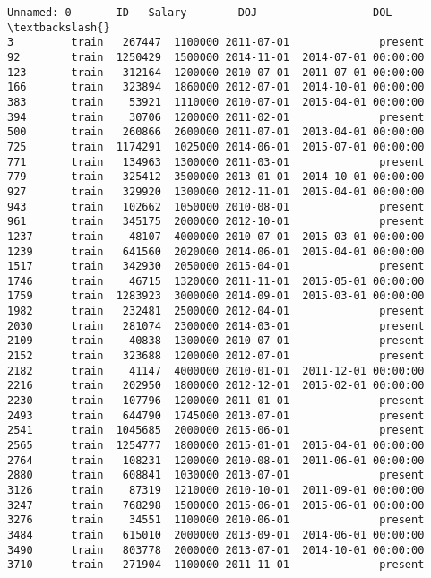 \documentclass[11pt]{article}
\makeatletter
\newcommand{\boxspacing}{\kern\kvtcb@left@rule\kern\kvtcb@boxsep}
\newcommand{\prompt}[4]{
        \ttfamily\llap{{\color{#2}[#3]:\hspace{3pt}#4}}\vspace{-\baselineskip}
    }
\makeatother
\begin{document}
            \begin{tcolorbox}[breakable, size=fbox, boxrule=.5pt, pad at break*=1mm, opacityfill=0]
\prompt{Out}{outcolor}{16}{\boxspacing}
\begin{Verbatim}[commandchars=\\\{\}]
     Unnamed: 0       ID   Salary        DOJ                  DOL  \textbackslash{}
3         train   267447  1100000 2011-07-01              present
92        train  1250429  1500000 2014-11-01  2014-07-01 00:00:00
123       train   312164  1200000 2010-07-01  2011-07-01 00:00:00
166       train   323894  1860000 2012-07-01  2014-10-01 00:00:00
383       train    53921  1110000 2010-07-01  2015-04-01 00:00:00
394       train    30706  1200000 2011-02-01              present
500       train   260866  2600000 2011-07-01  2013-04-01 00:00:00
725       train  1174291  1025000 2014-06-01  2015-07-01 00:00:00
771       train   134963  1300000 2011-03-01              present
779       train   325412  3500000 2013-01-01  2014-10-01 00:00:00
927       train   329920  1300000 2012-11-01  2015-04-01 00:00:00
943       train   102662  1050000 2010-08-01              present
961       train   345175  2000000 2012-10-01              present
1237      train    48107  4000000 2010-07-01  2015-03-01 00:00:00
1239      train   641560  2020000 2014-06-01  2015-04-01 00:00:00
1517      train   342930  2050000 2015-04-01              present
1746      train    46715  1320000 2011-11-01  2015-05-01 00:00:00
1759      train  1283923  3000000 2014-09-01  2015-03-01 00:00:00
1982      train   232481  2500000 2012-04-01              present
2030      train   281074  2300000 2014-03-01              present
2109      train    40838  1300000 2010-07-01              present
2152      train   323688  1200000 2012-07-01              present
2182      train    41147  4000000 2010-01-01  2011-12-01 00:00:00
2216      train   202950  1800000 2012-12-01  2015-02-01 00:00:00
2230      train   107796  1200000 2011-01-01              present
2493      train   644790  1745000 2013-07-01              present
2541      train  1045685  2000000 2015-06-01              present
2565      train  1254777  1800000 2015-01-01  2015-04-01 00:00:00
2764      train   108231  1200000 2010-08-01  2011-06-01 00:00:00
2880      train   608841  1030000 2013-07-01              present
3126      train    87319  1210000 2010-10-01  2011-09-01 00:00:00
3247      train   768298  1500000 2015-06-01  2015-06-01 00:00:00
3276      train    34551  1100000 2010-06-01              present
3484      train   615010  2000000 2013-09-01  2014-06-01 00:00:00
3490      train   803778  2000000 2013-07-01  2014-10-01 00:00:00
3710      train   271904  1100000 2011-11-01              present


\end{Verbatim}
\end{tcolorbox}
\end{document}
